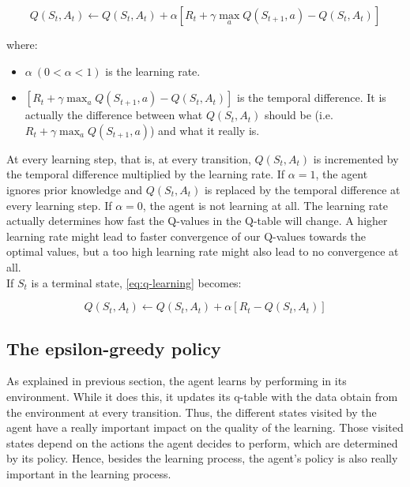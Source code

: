 \begin{equation} \label{eq:q-learning}
    Q(S_t,A_t) \leftarrow Q(S_t,A_t) + \alpha [R_t + \gamma \max_a Q(S_{t+1},a) - Q(S_t,A_t)] 
\end{equation}

where:
\begin{itemize}
    \item $\alpha\ (0 < \alpha < 1)$  is the learning rate.
    \item $[R_t + \gamma \max_a Q(S_{t+1},a) - Q(S_t,A_t)]$ is the temporal difference. It is actually the difference between what $Q(S_t,A_t)$ should be (i.e. $R_t + \gamma \max_a Q(S_{t+1},a)$) and what it really is. 
\end{itemize}\hfill\break
At every learning step, that is, at every transition, $Q(S_t,A_t)$ is incremented by the temporal difference multiplied by the learning rate. If $\alpha = 1$, the agent ignores prior knowledge and $Q(S_t,A_t)$ is replaced by the temporal difference at every learning step. If $\alpha = 0$, the agent is not learning at all. The learning rate actually determines how fast the Q-values in the Q-table will change. A higher learning rate might lead to faster convergence of our Q-values towards the optimal values, but a too high learning rate might also lead to no convergence at all.\\

If $S_t$ is a terminal state, \ref{eq:q-learning} becomes: 

\begin{equation}
    Q(S_t,A_t) \leftarrow Q(S_t,A_t) + \alpha [R_t - Q(S_t,A_t)] 
\end{equation}


\subsection{The epsilon-greedy policy} \label{sec:eps-greedy}

As explained in previous section, the agent learns by performing in its environment. While it does this, it updates its q-table with the data obtain from the environment at every transition. Thus, the different states visited by the agent have a really important impact on the quality of the learning. Those visited states depend on the actions the agent decides to perform, which are determined by its policy. Hence, besides the learning process, the agent's policy is also really important in the learning process.\\

